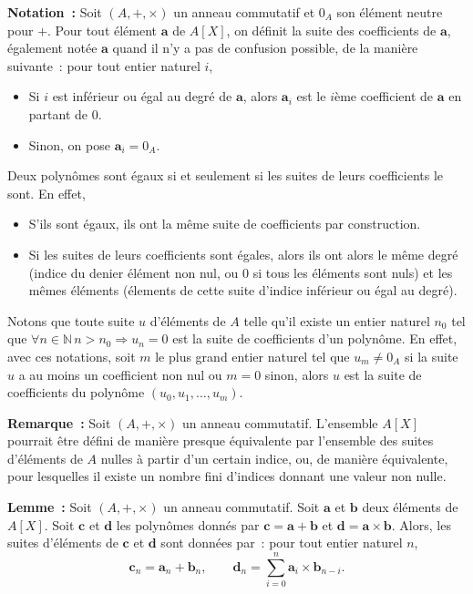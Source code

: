 \noindent\textbf{Notation :} 
    Soit $(A, +, \times)$ un anneau commutatif et $0_A$ son élément neutre pour $+$.
    Pour tout élément $\mathbf{a}$ de $A[X]$, on définit la suite des coefficients de $\mathbf{a}$, également notée $\mathbf{a}$ quand il n'y a pas de confusion possible, de la manière suivante : pour tout entier naturel $i$, 
\begin{itemize}[nosep]
    \item Si $i$ est inférieur ou égal au degré de $\mathbf{a}$, alors $\mathbf{a}_i$ est le $i$ème coefficient de $\mathbf{a}$ en partant de $0$.
    \item Sinon, on pose $\mathbf{a}_i = 0_A$.
\end{itemize}
Deux polynômes sont égaux si et seulement si les suites de leurs coefficients le sont.
En effet, 
\begin{itemize}[nosep]
    \item S'ils sont égaux, ils ont la même suite de coefficients par construction.
    \item Si les suites de leurs coefficients sont égales, alors ils ont alors le même degré (indice du denier élément non nul, ou $0$ si tous les éléments sont nuls) et les mêmes éléments (élements de cette suite d'indice inférieur ou égal au degré).
\end{itemize}
Notons que toute suite $u$ d'éléments de $A$ telle qu'il existe un entier naturel $n_0$ tel que $\forall n \in \mathbb{N} \, n > n_0 \Rightarrow u_n = 0$ est la suite de coefficients d'un polynôme. 
En effet, avec ces notations, soit $m$ le plus grand entier naturel tel que $u_m \neq 0_A$ si la suite $u$ a au moins un coefficient non nul ou $m = 0$ sinon, alors $u$ est la suite de coefficients du polynôme $(u_0, u_1, \dots, u_m)$.

\medskip

\noindent\textbf{Remarque :} 
    Soit $(A, +, \times)$ un anneau commutatif.
    L'ensemble $A[X]$ pourrait être défini de manière presque équivalente par l'ensemble des suites d'éléments de $A$ nulles à partir d'un certain indice, ou, de manière équivalente, pour lesquelles il existe un nombre fini d'indices donnant une valeur non nulle.

\medskip

\noindent\textbf{Lemme :}
    Soit $(A, +, \times)$ un anneau commutatif.
    Soit $\mathbf{a}$ et $\mathbf{b}$ deux éléments de $A[X]$. 
    Soit $\mathbf{c}$ et $\mathbf{d}$ les polynômes donnés par $\mathbf{c} = \mathbf{a} + \mathbf{b}$ et $\mathbf{d} = \mathbf{a} \times \mathbf{b}$.
    Alors, les suites d'éléments de $\mathbf{c}$ et $\mathbf{d}$ sont données par : pour tout entier naturel $n$, 
    \begin{equation*}
        \mathbf{c}_n = \mathbf{a}_n + \mathbf{b}_n, 
        \qquad
        \mathbf{d}_n = \sum_{i=0}^n \mathbf{a}_i \times \mathbf{b}_{n-i}
        .
    \end{equation*}

